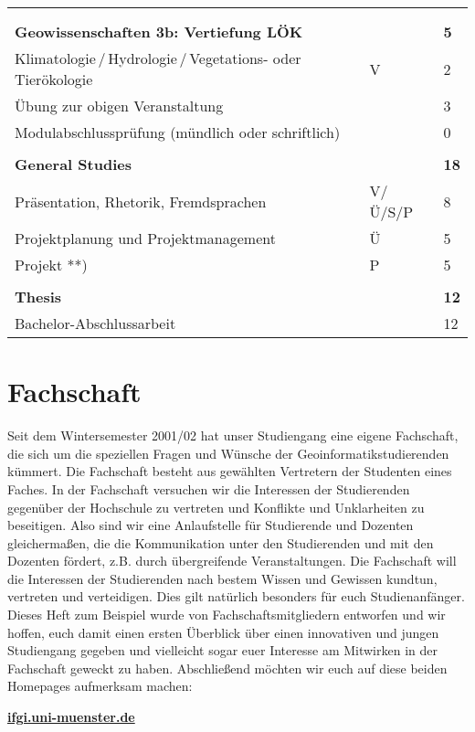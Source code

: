 \begin{longtable}{p{} p{} p{}}
&&\\
&&\\
\textbf{Geowissenschaften 3b: Vertiefung LÖK} & & \textbf{5}\\
Klimatologie\,/\,Hydrologie\,/\,Vegetations- oder Tierökologie& V & 2\\
Übung zur obigen Veranstaltung &  & 3\\
Modulabschlussprüfung (mündlich oder schriftlich) & & 0\\
&&\\
\textbf{General Studies} & & \textbf{18}\\
Präsentation, Rhetorik, Fremdsprachen & V/Ü/S/P & 8\\
Projektplanung und Projektmanagement & Ü & 5\\
Projekt **) & P & 5\\
&&\\
\textbf{Thesis} & & \textbf{12}\\
Bachelor-Abschlussarbeit & & 12\\

\end{longtable}

\newpage

\section*{Fachschaft}
Seit dem Wintersemester 2001/02 hat unser Studiengang eine eigene Fachschaft, die sich um die speziellen Fragen und Wünsche der Geoinformatikstudierenden kümmert. Die Fachschaft besteht aus gewählten Vertretern der Studenten eines Faches. In der Fachschaft versuchen wir die Interessen der Studierenden gegenüber der Hochschule zu vertreten und Konﬂikte und Unklarheiten zu beseitigen. Also sind wir eine Anlaufstelle für Studierende und Dozenten gleichermaßen, die die Kommunikation unter den Studierenden und mit den Dozenten fördert, z.B. durch übergreifende Veranstaltungen. Die Fachschaft will die Interessen der Studierenden nach bestem Wissen und Gewissen kundtun, vertreten und verteidigen. Dies gilt natürlich besonders für euch Studienanfänger. Dieses Heft zum Beispiel wurde von Fachschaftsmitgliedern entworfen und wir hoffen, euch damit einen ersten Überblick über einen innovativen und jungen Studiengang gegeben und vielleicht sogar euer Interesse am Mitwirken in der Fachschaft geweckt zu haben. Abschließend möchten wir euch auf diese beiden Homepages aufmerksam machen:

\begin{center}
\textbf{\url{ifgi.uni-muenster.de}}\\
\end{center}

